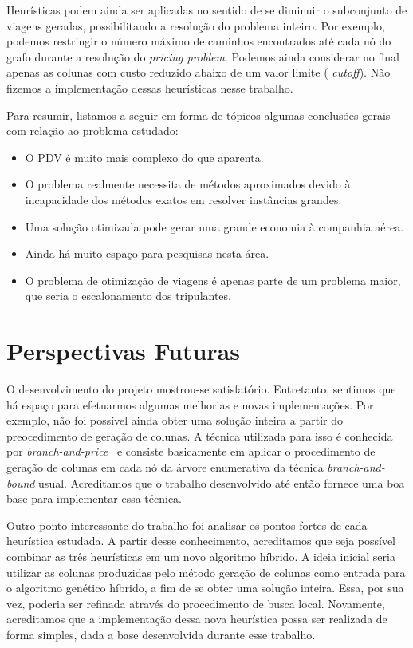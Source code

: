 Heurísticas podem ainda ser aplicadas no sentido de se diminuir o subconjunto de viagens geradas,
possibilitando a resolução do problema inteiro. Por exemplo, podemos restringir o número máximo de
caminhos encontrados até cada nó do grafo durante a resolução do {\it pricing problem}. Podemos
ainda considerar no final apenas as colunas com custo reduzido abaixo de um valor limite ({\it
cutoff}). Não fizemos a implementação dessas heurísticas nesse trabalho.

Para resumir, listamos a seguir em forma de tópicos algumas conclusões gerais com relação ao
problema estudado:

\begin{itemize}
\item O PDV é muito mais complexo do que aparenta. 
\item O problema realmente necessita de métodos aproximados devido à incapacidade dos métodos exatos
em resolver instâncias grandes.
\item Uma solução otimizada pode gerar uma grande economia à companhia aérea.
\item Ainda há muito espaço para pesquisas nesta área. 
\item O problema de otimização de viagens é apenas parte de um problema maior, que seria o
escalonamento dos tripulantes.
\end{itemize}


\section{Perspectivas Futuras}
\label{sec:perspectivas}

O desenvolvimento do projeto mostrou-se satisfatório. Entretanto, sentimos que há espaço para
efetuarmos algumas melhorias e novas implementações. Por exemplo, não foi possível ainda obter uma
solução inteira a partir do preocedimento de geração de colunas. A técnica utilizada para isso é
conhecida por {\it branch-and-price}~\cite{vance97h} e consiste basicamente em aplicar o
procedimento de geração de colunas em cada nó da árvore enumerativa da técnica {\it
branch-and-bound} usual. Acreditamos que o trabalho desenvolvido até então fornece uma boa base para
implementar essa técnica.

Outro ponto interessante do trabalho foi analisar os pontos fortes de cada heurística estudada. A
partir desse conhecimento, acreditamos que seja possível combinar as três heurísticas em um novo
algoritmo híbrido. A ideia inicial seria utilizar as colunas produzidas pelo método geração de
colunas como entrada para o algoritmo genético híbrido, a fim de se obter uma solução inteira. Essa,
por sua vez, poderia ser refinada através do procedimento de busca local. Novamente, acreditamos que
a implementação dessa nova heurística possa ser realizada de forma simples, dada a base desenvolvida
durante esse trabalho.

